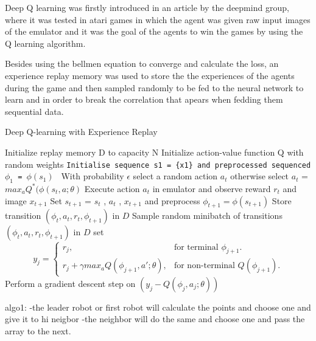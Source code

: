 \documentclass[12pt]{article}
\begin{document}
Deep Q learning was firstly introduced in an article by the deepmind group, where it was tested in atari games in which the agent was given raw input images of the emulator and it was the  goal of the agents to win the games by using the Q learning algorithm.

Besides using the bellmen equation to converge and calculate the loss, an experience replay memory was used to store the the experiences of the agents during  the game and then sampled randomly to be  fed to the neural network to learn and in order to break the correlation that apears when fedding them sequential data.\cite{mnih2013playing}
 
\begin{algorithm}
\caption{Deep Q-learning with Experience Replay}\label{alg:cap}
\begin{algorithmic}
\State Initialize replay memory D to capacity N
\State Initialize action-value function Q with random weights
        \State \texttt{Initialise sequence s1 = \{x1\} and preprocessed sequenced $\phi_{1}$ = $\phi(s_{1})$  }
         \State With probability $\epsilon$ select a random action $a_{t}$
         \State otherwise select  $a_{t}$ = $max_{a} Q^{*}(\phi(s_{t},a;\theta) $ 
         \State Execute action $a_{t}$ in emulator and observe reward ${r_{t}}$ and image $x_{t+1}$
        \State Set $s_{t+1}$ = $s_{t}$ , $a_{t}$ , $x_{t+1}$ and preprocess  
        $\phi_{t+1}=\phi(s_{t+1})$
        \State Store transition $(\phi_{t} , a_{t} , r_{t} , \phi_{t+1} )$ in $D$
        \State Sample random
minibatch of transitions $(\phi_{t} , a_{t} , r_{t} , \phi_{t+1} )$ in $D$
        \State set  \begin{equation}
  y_{j}=\begin{cases}
    r_{j}, & \text{for terminal $\phi_{j+1} $}.\\
    r_{j}+\gamma max_{a}Q(\phi_{j+1},a';\theta) , & \text{for non-terminal $Q(\phi_{j+1})$}.
  \end{cases}
\end{equation}
        \State Perform a gradient descent step on $(y_{j} - Q(\phi_{j} , a_{j} ; \theta))$ 
        \EndFor 
\EndFor 


\end{algorithmic}
\end{algorithm}
 

 
 
algo1:
  -the leader robot or first robot will calculate the points and choose one
  and give it to hi neigbor
  -the neighbor will do the same and choose one and pass the array to the next.
  
\end{document}
